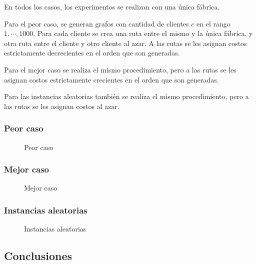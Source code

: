 \documentclass[a4paper, 10pt, twoside]{article}
\newcommand{\tresgraficos}[3]{
    \newcommand{\separacion}{-2.2em}
    \vspace{\separacion}
    
    \vspace{\separacion}
    
    \vspace{\separacion}
    
}
\begin{document}
En todos los casos, los experimentos se realizan con una única fábrica.

Para el peor caso, se generan grafos con cantidad de clientes $c$ en el rango $1, \cdots, 1000$. Para cada cliente se crea una ruta entre el mismo y la única fábrica, y otra ruta entre el cliente y otro cliente al azar. A las rutas se les asignan costos estrictamente decrecientes en el orden que son generadas.

Para el mejor caso se realiza el mismo procedimiento, pero a las rutas se les asignan costos estrictamente crecientes en el orden que son generadas.

Para las instancias aleatorias también se realiza el mismo procedimiento, pero a las rutas se les asignan costos al azar.

\newpage


\subsubsection{Peor caso}

\begin{figure}[H]
  \centering
  \tresgraficos{problema3-peor-caso}
               {problema3-peor-caso-logn}
               {problema3-peor-caso-n}
  \caption{Peor caso}
\end{figure}


\subsubsection{Mejor caso}

\begin{figure}[H]
  \centering
  \tresgraficos{problema3-mejor-caso}
               {problema3-mejor-caso-logn}
               {problema3-mejor-caso-n}
  \caption{Mejor caso}
\end{figure}


\subsubsection{Instancias aleatorias}

\begin{figure}[H]
  \centering
  \tresgraficos{problema3-instancias-aleatorias}
               {problema3-instancias-aleatorias-logn}
               {problema3-instancias-aleatorias-n}
  \caption{Instancias aleatorias}
\end{figure}


\subsection{Conclusiones}
\end{document}
